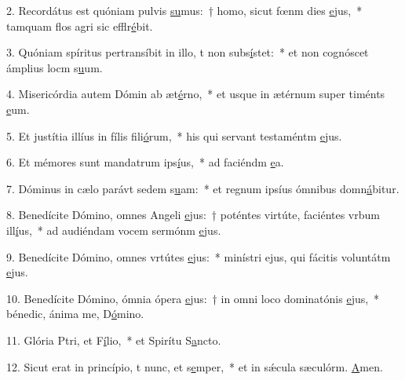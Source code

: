 2. Recordátus est quóniam pulvis \uline{su}mus:~† homo, sicut fœnm dies \uline{e}jus,~* tamquam flos agri sic efflr\uline{é}bit.\par 
3. Quóniam spíritus pertransíbit in illo, t non subs\uline{í}stet:~* et non cognóscet ámplius locm s\uline{u}um.\par 
4. Misericórdia autem Dómin ab æt\uline{é}rno,~* et usque in ætérnum super timénts \uline{e}um.\par 
5. Et justítia illíus in fílis fili\uline{ó}rum,~* his qui servant testaméntm \uline{e}jus.\par 
6. Et mémores sunt mandatrum ips\uline{í}us,~* ad faciéndm \uline{e}a.\par 
7. Dóminus in cælo parávt sedem s\uline{u}am:~* et regnum ipsíus ómnibus domn\uline{á}bitur.\par 
8. Benedícite Dómino, omnes Angeli \uline{e}jus:~† poténtes virtúte, faciéntes vrbum ill\uline{í}us,~* ad audiéndam vocem sermónm \uline{e}jus.\par 
9. Benedícite Dómino, omnes vrtútes \uline{e}jus:~* minístri ejus, qui fácitis voluntátm \uline{e}jus.\par 
10. Benedícite Dómino, ómnia ópera \uline{e}jus:~† in omni loco dominatónis \uline{e}jus,~* bénedic, ánima me, D\uline{ó}mino.\par 
11. Glória Ptri, et F\uline{í}lio,~* et Spirítu S\uline{a}ncto.\par 
12. Sicut erat in princípio, t nunc, et s\uline{e}mper,~* et in sǽcula sæculórm. \uline{A}men.\par 
